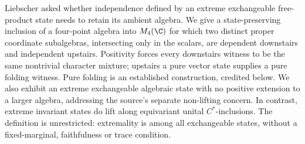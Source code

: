
Liebscher asked whether independence defined by an extreme exchangeable
free-product state needs to retain its ambient algebra. We give a
state-preserving inclusion of a four-point algebra into \(M_4(\C)\) for
which two distinct proper coordinate subalgebras, intersecting only in
the scalars, are dependent downstairs and independent upstairs.
Positivity forces every downstairs witness to be the same nontrivial
character mixture; upstairs a pure vector state supplies a pure folding
witness. Pure folding is an established construction, credited below.
We also exhibit an extreme exchangeable algebraic state with no positive
extension to a larger algebra, addressing the source's separate
non-lifting concern. In contrast, extreme invariant states do lift
along equivariant unital \(C^*\)-inclusions. The definition is unrestricted:
extremality is among all exchangeable states, without a fixed-marginal,
faithfulness or trace condition.
